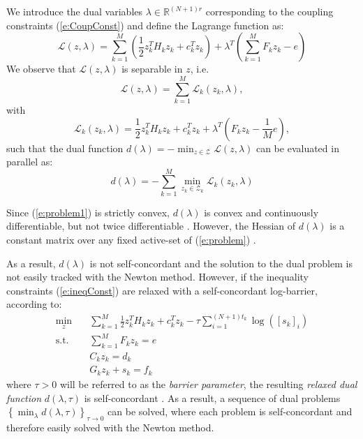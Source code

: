 We introduce the dual variables $\lambda \in \mathbb{R}^{(N+1) r}$ corresponding to the coupling constraints (\ref{e:CoupConst}) and define the Lagrange function as:
\begin{equation}
\mathcal{L}(z,\lambda) =  \sum_{k=1}^{M} ( \frac{1}{2}z_k^TH_kz_k + c_k^Tz_k ) + \lambda^T ( \sum_{k=1}^{M} F_k z_k - e )
\end{equation}
We observe that $\mathcal{L}(z,\lambda)$ is separable in $z$, i.e.
\begin{equation}
\mathcal{L}(z,\lambda) = \sum_{k=1}^{M} \mathcal{L}_k (z_k,\lambda),
\end{equation}
with
\begin{equation}
\mathcal{L}_k(z_k,\lambda) = \frac{1}{2}z_k^TH_k z_k + c_k^T z_k + \lambda^T(F_k z_k - \frac{1}{M} e),
\end{equation}
such that the dual function $d(\lambda) = -\min_{z \in \mathcal{Z}} \mathcal{L}(z,\lambda)$ can be evaluated in parallel as:
\begin{equation}
\label{e:dualfunction}
d(\lambda) = -\sum_{k=1}^M \min_{z_k \in \mathcal{Z}_k} \mathcal{L}_k(z_k,\lambda)
\end{equation}

Since (\ref{e:problem1}) is strictly convex, $d(\lambda)$ is convex and continuously differentiable, but not twice differentiable \cite{Kozma2014a}. However, the Hessian of $d(\lambda)$ is a constant matrix over any fixed active-set of (\ref{e:problem}) \cite{Kozma2014a}.

As a result, $d(\lambda)$ is not self-concordant and the solution to the dual problem is not easily tracked with the Newton method. However, if the inequality constraints (\ref{e:ineqConst}) are relaxed with a self-concordant log-barrier, according to:
\begin{subequations}
\label{e:relaxedproblem}
\begin{align}
\min_z & \quad \sum_{k=1}^{M} \frac{1}{2}z_k^TH_k z_k + c_k^T z_k - \tau \sum_{i=1}^{(N+1)t_k} \log([s_k]_i) \label{e:1} \\
\text{s.t.} & \quad \sum_{k=1}^{M} F_k z_k = e \\
& \quad C_k z_k = d_k \\
& \quad G_k z_k + s_k = f_k
\end{align}
\end{subequations}
where $\tau > 0$ will be referred to as the \emph{barrier parameter}, the resulting \emph{relaxed dual function} $d(\lambda, \tau)$ is self-concordant \cite{Necoara2009a}. As a result, a sequence of dual problems $\left\{\min_\lambda d(\lambda, \tau) \right\}_{\tau \rightarrow 0}$ can be solved, where each problem is self-concordant and therefore easily solved with the Newton method.

